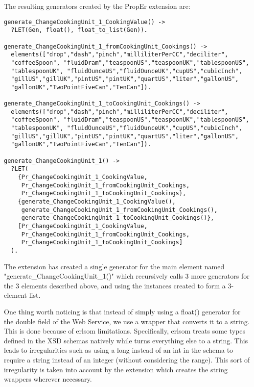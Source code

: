 \documentclass[submission,copyright]{eptcs}
\begin{document}
The resulting generators created by the PropEr extension are:

\begin{lstlisting}
generate_ChangeCookingUnit_1_CookingValue() ->
  ?LET(Gen, float(), float_to_list(Gen)).

generate_ChangeCookingUnit_1_fromCookingUnit_Cookings() ->
  elements(["drop","dash","pinch","milliliterPerCC","deciliter",
  "coffeeSpoon", "fluidDram","teaspoonUS","teaspoonUK","tablespoonUS",
  "tablespoonUK", "fluidOunceUS","fluidOunceUK","cupUS","cubicInch",
  "gillUS","gillUK","pintUS","pintUK","quartUS","liter","gallonUS",
  "gallonUK","TwoPointFiveCan","TenCan"]).

generate_ChangeCookingUnit_1_toCookingUnit_Cookings() ->
  elements(["drop","dash","pinch","milliliterPerCC","deciliter",
  "coffeeSpoon", "fluidDram","teaspoonUS","teaspoonUK","tablespoonUS",
  "tablespoonUK", "fluidOunceUS","fluidOunceUK","cupUS","cubicInch",
  "gillUS","gillUK","pintUS","pintUK","quartUS","liter","gallonUS",
  "gallonUK","TwoPointFiveCan","TenCan"]).

generate_ChangeCookingUnit_1() ->
  ?LET(
    {Pr_ChangeCookingUnit_1_CookingValue,
     Pr_ChangeCookingUnit_1_fromCookingUnit_Cookings,
     Pr_ChangeCookingUnit_1_toCookingUnit_Cookings},
    {generate_ChangeCookingUnit_1_CookingValue(),    
     generate_ChangeCookingUnit_1_fromCookingUnit_Cookings(),
     generate_ChangeCookingUnit_1_toCookingUnit_Cookings()},
    [Pr_ChangeCookingUnit_1_CookingValue,
     Pr_ChangeCookingUnit_1_fromCookingUnit_Cookings, 
     Pr_ChangeCookingUnit_1_toCookingUnit_Cookings]
  ).
\end{lstlisting}

The extension has created a single generator for the main element named "generate\_ChangeCookingUnit\_1()" which recursively calls 3 more generators for the 3 elements described above, and using the instances created to form a 3-element list. 

One thing worth noticing is that instead of simply using a float() generator for the double field of the Web Service, we use a wrapper that converts it to a string. This is done because of erlsom limitations. Specifically, erlsom treats some types defined in the XSD schemas natively while turns everything else to a string. This leads to irregularities such as using a long instead of an int in the schema to require a string instead of an integer (without considering the range). This sort of irregularity is taken into account by the extension which creates the string wrappers wherever necessary.
\end{document}
